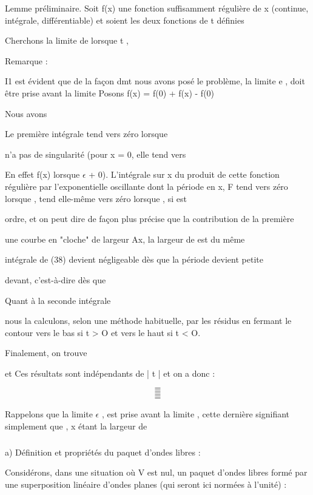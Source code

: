 Lemme préliminaire.
Soit f(x) une fonction suffisamment régulière de x (continue,
intégrale, différentiable) et soient  les deux fonctions de t définies

Cherchons la limite de  lorsque t ,

Remarque :

I1 est évident que de la façon dmt nous avons posé le problème, la limite
e , doit être prise avant la limite
Posons f(x) = f(0) + f(x) - f(0)

Nous avons

Le première intégrale tend vers zéro lorsque

 n'a pas de singularité (pour x = 0, elle tend vers

En effet
f(x) lorsque $\epsilon$ + 0). L'intégrale sur x du produit de cette fonction régulière
par l'exponentielle oscillante  dont la période en x, F tend vers
zéro lorsque , tend elle-même vers zéro lorsque , si  est

ordre, et on peut dire de façon plus précise que la contribution de la première

une courbe en "cloche" de largeur Ax, la largeur de est du même

 intégrale de (38) devient négligeable dès que la période devient petite

devant, c'est-à-dire dès que 

Quant à la seconde intégrale

nous la calculons, selon une méthode habituelle, par les résidus en fermant
le contour vers le bas si t > O et vers le haut si t < O.


Finalement, on trouve

et
Ces résultats sont indépendants de | t | et on a donc :

\[
\tag{39-a}=
\]
\[
\tag{39-b}=
\]
\[
\tag{39-c}=
\]
\[
\tag{39-d}=
\]

Rappelons que la limite $\epsilon$ , est prise avant la limite  , cette
dernière signifiant simplement que , x étant la largeur de

\subsubsection{}%
a) Définition et propriétés du paquet d'ondes libres :

Considérons, dans une situation où V est nul, un paquet d'ondes
libres formé par une superposition linéaire d'ondes planes 
(qui seront ici normées à l'unité) :

